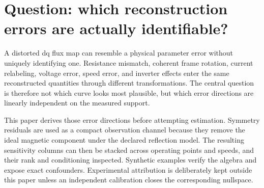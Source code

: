 
\section{Question: which reconstruction errors are actually identifiable?}
A distorted dq flux map can resemble a physical parameter error without uniquely identifying one. Resistance mismatch, coherent frame rotation, current relabeling, voltage error, speed error, and inverter effects enter the same reconstructed quantities through different transformations. The central question is therefore not which curve looks most plausible, but which error directions are linearly independent on the measured support.

This paper derives those error directions before attempting estimation. Symmetry residuals are used as a compact observation channel because they remove the ideal magnetic component under the declared reflection model. The resulting sensitivity columns can then be stacked across operating points and speeds, and their rank and conditioning inspected. Synthetic examples verify the algebra and expose exact confounders. Experimental attribution is deliberately kept outside this paper unless an independent calibration closes the corresponding nullspace.
